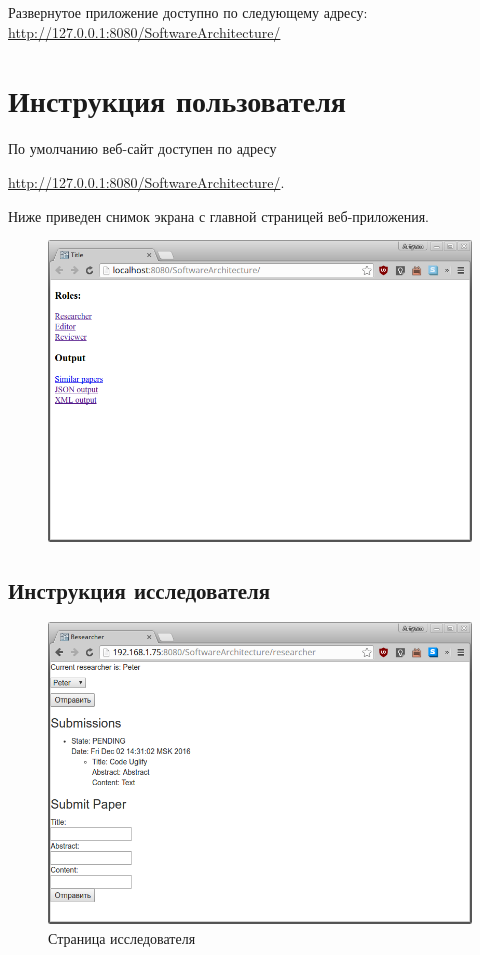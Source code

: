 Развернутое приложение доступно по следующему адресу: \\ \url{http://127.0.0.1:8080/SoftwareArchitecture/}

\section{Инструкция пользователя}

По умолчанию веб-сайт доступен по адресу

\url{http://127.0.0.1:8080/SoftwareArchitecture/}.

Ниже приведен снимок экрана с главной страницей веб-приложения.

\begin{figure}[H]
\centering
\includegraphics[width=\textwidth]{page.png}
\caption{}
\end{figure}

\subsection{Инструкция исследователя}

\begin{figure}[H]
\centering
\includegraphics[width=\textwidth]{researcher.png}
\caption{Страница исследователя}
\end{figure}

